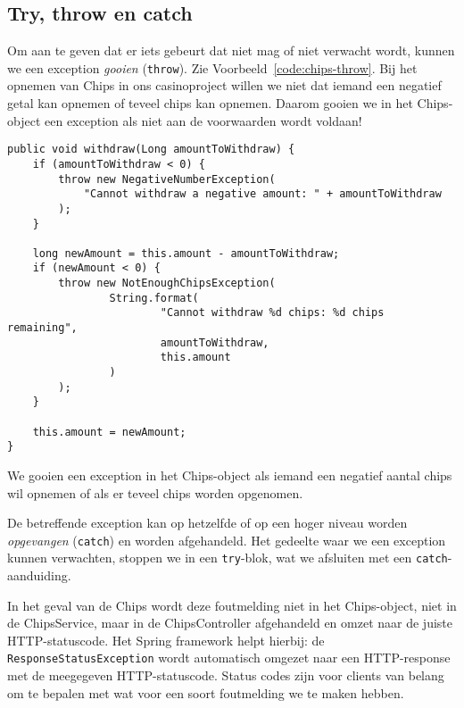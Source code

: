\documentclass[dutch,a4paper,12pt,doubleside]{book}
\begin{document}
\subsection{Try, throw en catch}
Om aan te geven dat er iets gebeurt dat niet mag of niet verwacht wordt, kunnen we een
exception \textit{gooien} (\texttt{throw}). Zie Voorbeeld~\ref{code:chips-throw}.
Bij het opnemen van Chips in ons casinoproject willen we niet dat iemand 
een negatief getal kan opnemen of teveel chips kan opnemen. Daarom gooien we in 
het Chips-object een exception als niet aan de voorwaarden wordt voldaan! 

\begin{listing}[H]
\begin{verbatim}
public void withdraw(Long amountToWithdraw) {
    if (amountToWithdraw < 0) {
        throw new NegativeNumberException(
            "Cannot withdraw a negative amount: " + amountToWithdraw
        );
    }

    long newAmount = this.amount - amountToWithdraw;
    if (newAmount < 0) {
        throw new NotEnoughChipsException(
                String.format(
                        "Cannot withdraw %d chips: %d chips remaining",
                        amountToWithdraw,
                        this.amount
                )
        );
    }

    this.amount = newAmount;
}
\end{verbatim}
\caption{We gooien een exception in het Chips-object als iemand een negatief aantal chips 
wil opnemen of als er teveel chips worden opgenomen.}
\label{code:chips-throw}
\end{listing}

De betreffende exception kan op hetzelfde 
of op een hoger niveau worden \textit{opgevangen} (\texttt{catch}) en worden afgehandeld.
Het gedeelte waar we een exception kunnen verwachten, stoppen we in een \texttt{try}-blok,
wat we afsluiten met een \texttt{catch}-aanduiding.

In het geval van de Chips wordt deze foutmelding niet in het Chips-object,
niet in de ChipsService, maar in de ChipsController afgehandeld en omzet naar 
de juiste HTTP-statuscode. Het Spring framework helpt hierbij: 
de \texttt{ResponseStatusException} wordt automatisch omgezet naar een HTTP-response met 
de meegegeven HTTP-statuscode. Status codes zijn voor clients van belang om te bepalen 
met wat voor een soort foutmelding we te maken hebben.
\end{document}
